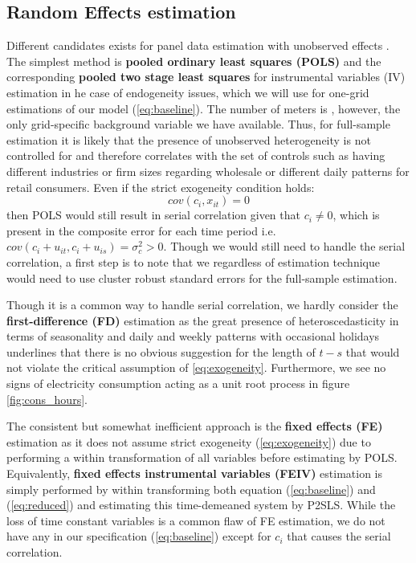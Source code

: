\subsection{Random Effects estimation}
\label{subsec:e_re}
Different candidates exists for panel data estimation with unobserved effects \citep{wooldridge2010econometric}. The simplest method is \textbf{pooled ordinary least squares (POLS)} and the corresponding \textbf{pooled two stage least squares} for instrumental variables (IV) estimation in he case of endogeneity issues, which we will use for one-grid estimations of our model (\ref{eq:baseline}). The number of meters is , however, the only grid-specific background variable we have available. Thus, for full-sample estimation it is likely that the presence of unobserved heterogeneity is not controlled for and therefore correlates with the set of controls such as having different industries or firm sizes regarding wholesale or different daily patterns for retail consumers. Even if the strict exogeneity condition holds:
\begin{equation}
  cov(c_i, x_{it})=0
  \label{eq:exogeneity}
\end{equation}
then POLS would still result in serial correlation given that $c_i\neq0$, which is present in the composite error for each time period i.e. $cov(c_i+u_{it},c_i+u_{is})=\sigma_c^2>0$. Though we would still need to handle the serial correlation, a first step is to note that we regardless of estimation technique would need to use cluster robust standard errors for the full-sample estimation.
\bigskip\par
Though it is a common way to handle serial correlation, we hardly consider the \textbf{first-difference (FD)} estimation as the great presence of heteroscedasticity in terms of seasonality and daily and weekly patterns with occasional holidays underlines that there is no obvious suggestion for the length of $t-s$ that would not violate the critical assumption of \eqref{eq:exogeneity}. Furthermore, we see no signs of electricity consumption acting as a unit root process in figure \ref{fig:cons_hours}.
\bigskip\par
The consistent but somewhat inefficient approach is the \textbf{fixed effects (FE)} estimation as it does not assume strict exogeneity (\ref{eq:exogeneity}) due to performing a within transformation of all variables before estimating by POLS. Equivalently, \textbf{fixed effects instrumental variables (FEIV)} estimation is simply performed by within transforming both equation (\ref{eq:baseline}) and (\ref{eq:reduced}) and estimating this time-demeaned system by P2SLS. While the loss of time constant variables is a common flaw of FE estimation, we do not have any in our specification (\ref{eq:baseline}) except for $c_i$ that causes the serial correlation.
